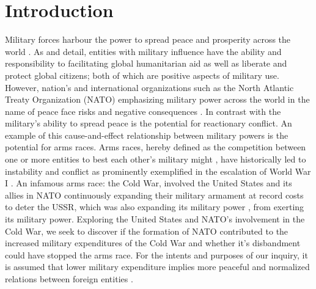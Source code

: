 \documentclass[12pt, centerh1]{article}
\begin{document}
\section{Introduction}
Military forces harbour the power to spread peace and prosperity across the world \citep{rigby2006there}. As \cite{rigby2006there} and \cite{bellamy2009responsibility} detail, entities with military influence have the ability and responsibility to facilitating global humanitarian aid as well as liberate and protect global citizens; both of which are positive aspects of military use. However, nation's and international organizations such as the North Atlantic Treaty Organization (NATO) emphasizing military power across the world in the name of peace face risks and negative consequences \citep{rigby2006there}. In contrast with the military's ability to spread peace is the potential for reactionary conflict. An example of this cause-and-effect relationship between military powers is the potential for arms races.  Arms races, hereby defined as the competition between one or more entities to best each other's military might \citep{smith2020influence}, have historically led to instability and conflict as prominently exemplified in the escalation of World War I \citep{mahnken2016arms}. An infamous arms race: the Cold War, involved the United States and its allies in NATO continuously expanding their military armament at record costs \citep{10.2307/446958} to deter the USSR, which was also expanding its military power \citep{yost2010nato}, from exerting its military power. Exploring the United States and NATO's involvement in the Cold War, we seek to discover if the formation of NATO contributed to the increased military expenditures of the Cold War and whether it's disbandment could have stopped the arms race. For the intents and purposes of our inquiry, it is assumed that lower military expenditure implies more peaceful and normalized relations between foreign entities \citep{solarin2018determinants}.
\end{document}
